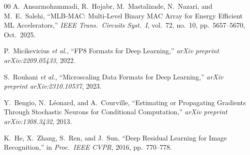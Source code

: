 \documentclass[conference]{IEEEtran}
\begin{document}
\begin{thebibliography}{00}
    A.~Ansarmohammadi, R.~Hojabr, M.~Mastalizade, N.~Nazari, and
    M.~E.~Salehi,
    ``MLB-MAC: Multi-Level Binary MAC Array for Energy Efficient ML
    Accelerators,''
    \textit{IEEE Trans.\ Circuits Syst.\ I}, vol.~72, no.~10,
    pp.~5657--5670, Oct.\ 2025.

    P.~Micikevicius \textit{et al.},
    ``FP8 Formats for Deep Learning,''
    \textit{arXiv preprint arXiv:2209.05433}, 2022.

    S.~Rouhani \textit{et al.},
    ``Microscaling Data Formats for Deep Learning,''
    \textit{arXiv preprint arXiv:2310.10537}, 2023.

    Y.~Bengio, N.~L{\'e}onard, and A.~Courville,
    ``Estimating or Propagating Gradients Through Stochastic
    Neurons for Conditional Computation,''
    \textit{arXiv preprint arXiv:1308.3432}, 2013.

    K.~He, X.~Zhang, S.~Ren, and J.~Sun,
    ``Deep Residual Learning for Image Recognition,''
    in \textit{Proc.\ IEEE CVPR}, 2016, pp.~770--778.

\end{thebibliography}
\end{document}
